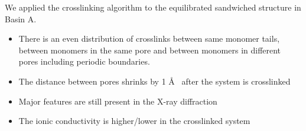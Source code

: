 \documentclass{article}
\newcommand{\angstrom}{\textup{\AA}}
\begin{document}
  We applied the crosslinking algorithm to the equilibrated sandwiched structure in 
  Basin A.
  \begin{itemize}  %
  	\item There is an even distribution of crosslinks between same monomer tails, 
	between monomers in the same pore and between monomers in different pores 
	including periodic boundaries.
	\item The distance between pores shrinks by 1 \angstrom~ after the system is 
	crosslinked
	\item Major features are still present in the X-ray diffraction
	\item The ionic conductivity is higher/lower in the crosslinked system
  \end{itemize}
\end{document}
